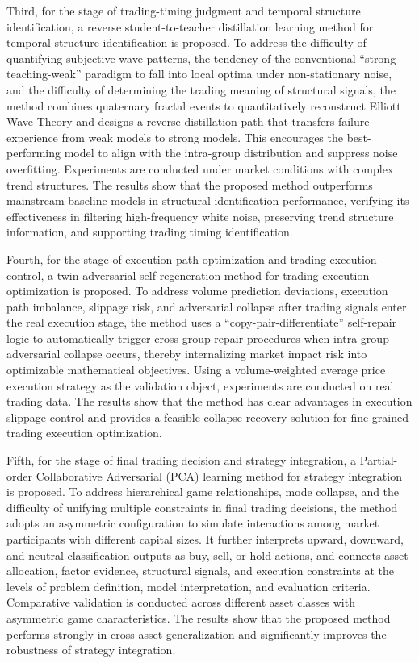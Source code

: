 \begin{eabstract}
Third, for the stage of trading-timing judgment and temporal structure identification, a reverse student-to-teacher distillation learning method for temporal structure identification is proposed. To address the difficulty of quantifying subjective wave patterns, the tendency of the conventional ``strong-teaching-weak'' paradigm to fall into local optima under non-stationary noise, and the difficulty of determining the trading meaning of structural signals, the method combines quaternary fractal events to quantitatively reconstruct Elliott Wave Theory and designs a reverse distillation path that transfers failure experience from weak models to strong models. This encourages the best-performing model to align with the intra-group distribution and suppress noise overfitting. Experiments are conducted under market conditions with complex trend structures. The results show that the proposed method outperforms mainstream baseline models in structural identification performance, verifying its effectiveness in filtering high-frequency white noise, preserving trend structure information, and supporting trading timing identification.

Fourth, for the stage of execution-path optimization and trading execution control, a twin adversarial self-regeneration method for trading execution optimization is proposed. To address volume prediction deviations, execution path imbalance, slippage risk, and adversarial collapse after trading signals enter the real execution stage, the method uses a ``copy-pair-differentiate'' self-repair logic to automatically trigger cross-group repair procedures when intra-group adversarial collapse occurs, thereby internalizing market impact risk into optimizable mathematical objectives. Using a volume-weighted average price execution strategy as the validation object, experiments are conducted on real trading data. The results show that the method has clear advantages in execution slippage control and provides a feasible collapse recovery solution for fine-grained trading execution optimization.

Fifth, for the stage of final trading decision and strategy integration, a Partial-order Collaborative Adversarial (PCA) learning method for strategy integration is proposed. To address hierarchical game relationships, mode collapse, and the difficulty of unifying multiple constraints in final trading decisions, the method adopts an asymmetric configuration to simulate interactions among market participants with different capital sizes. It further interprets upward, downward, and neutral classification outputs as buy, sell, or hold actions, and connects asset allocation, factor evidence, structural signals, and execution constraints at the levels of problem definition, model interpretation, and evaluation criteria. Comparative validation is conducted across different asset classes with asymmetric game characteristics. The results show that the proposed method performs strongly in cross-asset generalization and significantly improves the robustness of strategy integration.


\end{eabstract}
